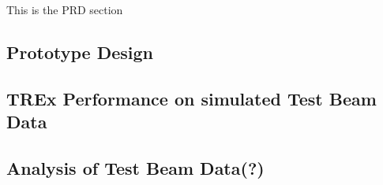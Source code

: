 This is the PRD section

\subsection{Prototype Design}
\subsection{TREx Performance on simulated Test Beam Data}
\subsection{Analysis of Test Beam Data(?)}